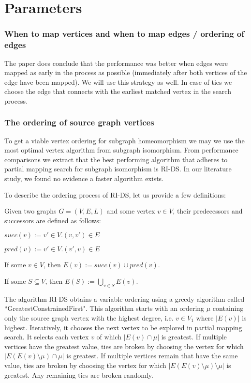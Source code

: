 \section{Parameters}

\subsubsection{When to map vertices and when to map edges / ordering of edges}
The paper does conclude that the performance was better when edges were mapped as early in the process as possible (immediately after both vertices of the edge have been mapped). We will use this strategy as well. In case of ties we choose the edge that connects with the earliest matched vertex in the search process.

\subsubsection{The ordering of source graph vertices}
To get a viable vertex ordering for subgraph homeomorphism we may we use the most optimal vertex algorithm from subgraph isomorphism. From performance comparisons we extract that the best performing algorithm that adheres to partial mapping search for subgraph isomorphism is RI-DS. In our literature study, we found no evidence a faster algorithm exists. 

To describe the ordering process of RI-DS, let us provide a few definitions:


\begin{defn}
Given two graphs $G=(V, E, L)$ and some vertex $v \in V$, their predecessors and successors are defined as follows:

$succ(v) := {v' \in V . (v, v') \in E}$

$pred(v) := {v' \in V . (v', v) \in E}$
 
\end{defn}

\begin{defn}
If some $v\in V$, then $E(v):= succ(v) \cup pred(v)$.
\end{defn}

\begin{defn}
If some $S\subseteq V$, then $E(S):=\bigcup\limits_{v \in S} E(v)$.
\end{defn}


The algorithm RI-DS obtains a variable ordering using a greedy algorithm called ``GreatestConstrainedFirst". This algorithm starts with an ordering $\mu$ containing only the source graph vertex with the highest degree, i.e. $v\in V_1$ where $|E(v)|$ is highest. Iteratively, it chooses the next vertex to be explored in partial mapping search. It selects each vertex $v$ of which $|E(v)\cap \mu|$ is greatest. If multiple vertices have the greatest value, ties are broken by choosing the vertex for which $|E(E(v)\setminus \mu)\cap \mu|$ is greatest. If multiple vertices remain that have the same value, ties are broken by choosing the vertex for which $|E(E(v)\setminus \mu)\setminus \mu|$ is greatest. Any remaining ties are broken randomly.

